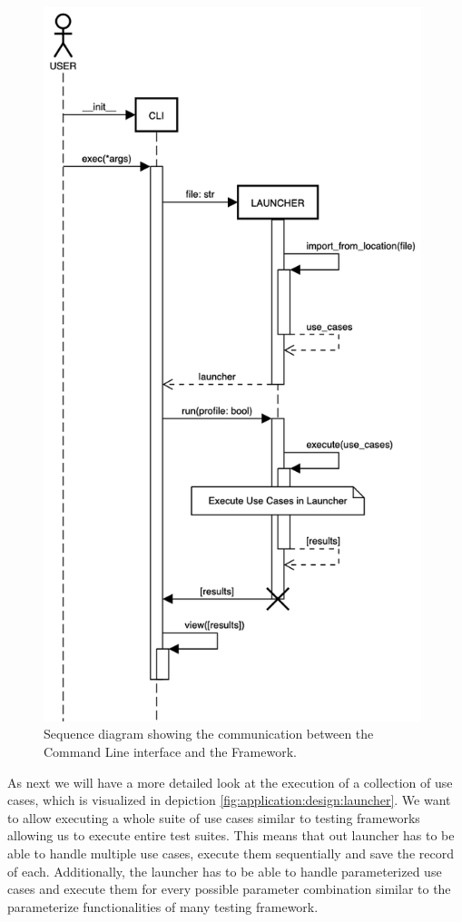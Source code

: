\begin{figure}[h]
    \centering
    \includegraphics[width=11cm]{resources/img/sequence/cli}
    \caption{
        Sequence diagram showing the communication between the Command Line
        interface and the Framework.
    }
    \label{fig:application:design:cli}
\end{figure}


As next we will have a more detailed look at the execution of a collection of
use cases, which is visualized in depiction
\ref{fig:application:design:launcher}. We want to allow executing a whole suite
of use cases similar to testing frameworks allowing us to execute entire test
suites. This means that out launcher has to be able to handle multiple use
cases, execute them sequentially and save the record of each. Additionally, the
launcher has to be able to handle parameterized use cases and execute them for
every possible parameter combination similar to the parameterize functionalities
of many testing framework. 

